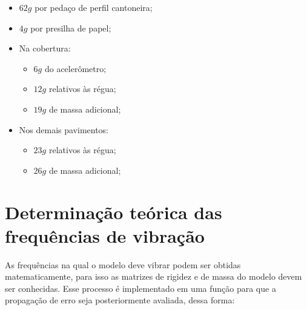 \begin{itemize}
\item
  \(62g\) por pedaço de perfil cantoneira;
\item
  \(4g\) por presilha de papel;
\item
  Na cobertura:

  \begin{itemize}
  \item
    \(6g\) do acelerômetro;
  \item
    \(12g\) relativos às régua;
  \item
    \(19g\) de massa adicional;
  \end{itemize}
\item
  Nos demais pavimentos:

  \begin{itemize}
  \item
    \(23g\) relativos às régua;
  \item
    \(26g\) de massa adicional;
  \end{itemize}
\end{itemize}

    \hypertarget{determinauxe7uxe3o-teuxf3rica-das-frequuxeancias-devibrauxe7uxe3o}{%
\section{Determinação teórica das frequências de vibração}\label{determinauxe7uxe3o-teuxf3rica-das-frequuxeancias-devibrauxe7uxe3o}}

As frequências na qual o modelo deve vibrar podem ser obtidas
matematicamente, para isso as matrizes de rigidez e de massa do modelo
devem ser conhecidas. Esse processo é implementado em uma função para
que a propagação de erro seja posteriormente avaliada, dessa forma:

